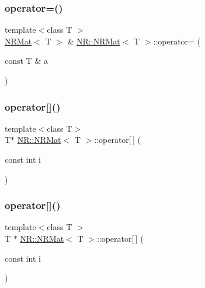 \mbox{\label{classNR_1_1NRMat_aa8efc1ec6e359056021124611896357b}} 
\subsubsection{\texorpdfstring{operator=()}{operator=()}\hspace{0.1cm}{\footnotesize\ttfamily [4/4]}}
{\footnotesize\ttfamily template$<$class T $>$ \\
\mbox{\hyperlink{classNR_1_1NRMat}{N\+R\+Mat}}$<$ T $>$ \& \mbox{\hyperlink{classNR_1_1NRMat}{N\+R\+::\+N\+R\+Mat}}$<$ T $>$\+::operator= (\begin{DoxyParamCaption}\item[{const T \&}]{a }\end{DoxyParamCaption})}

\mbox{\label{classNR_1_1NRMat_a387bf9be7d9606ea60e697c31c73df53}} 
\subsubsection{\texorpdfstring{operator[]()}{operator[]()}\hspace{0.1cm}{\footnotesize\ttfamily [1/4]}}
{\footnotesize\ttfamily template$<$class T$>$ \\
T$\ast$ \mbox{\hyperlink{classNR_1_1NRMat}{N\+R\+::\+N\+R\+Mat}}$<$ T $>$\+::operator\mbox{[}$\,$\mbox{]} (\begin{DoxyParamCaption}\item[{const int}]{i }\end{DoxyParamCaption})\hspace{0.3cm}{\ttfamily [inline]}}

\mbox{\label{classNR_1_1NRMat_aec79531b03f93f4a77b3f4aa534a61a5}} 
\subsubsection{\texorpdfstring{operator[]()}{operator[]()}\hspace{0.1cm}{\footnotesize\ttfamily [2/4]}}
{\footnotesize\ttfamily template$<$class T $>$ \\
T $\ast$ \mbox{\hyperlink{classNR_1_1NRMat}{N\+R\+::\+N\+R\+Mat}}$<$ T $>$\+::operator\mbox{[}$\,$\mbox{]} (\begin{DoxyParamCaption}\item[{const int}]{i }\end{DoxyParamCaption})\hspace{0.3cm}{\ttfamily [inline]}}

